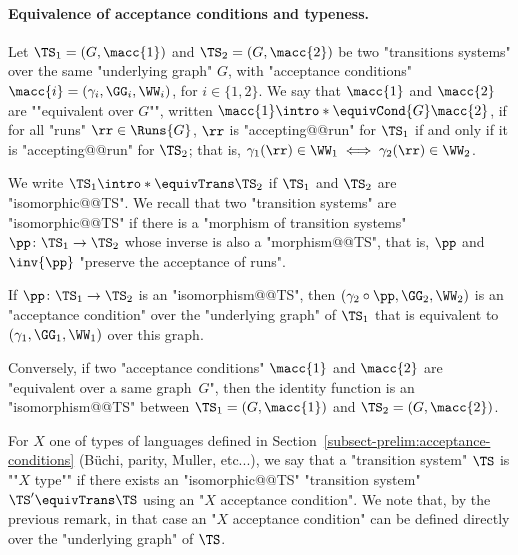 \documentclass[10pt,a4paper]{amsart}
\renewcommand{\gg}{\gamma}
\begin{document}
\paragraph*{Equivalence of acceptance conditions and typeness.}
 Let $\TS_1=(G, \macc{1})$ and $\TS_2=(G, \macc{2})$ be two "transitions systems" over the same "underlying graph" $G$, with "acceptance conditions" $\macc{i} = (\gg_i, \GG_i, \WW_i)$, for $i \in \{1,2\}$.
\AP We say that $\macc{1}$ and $\macc{2}$ are ""equivalent over $G$"", written $\macc{1} \intro*\equivCond{G} \macc{2}$, if for all "runs" $\rr\in \Runs{G}$, $\rr$ is "accepting@@run" for $\TS_1$ if and only if it is "accepting@@run" for $\TS_2$; that is, $\gg_{1}(\rr)\in \WW_1 \iff \gg_{2}(\rr)\in \WW_2$.

\AP We write $\TS_1 \intro*\equivTrans \TS_2$ if $\TS_1$ and $\TS_2$ are "isomorphic@@TS". We recall that two "transition systems" are "isomorphic@@TS" if there is a "morphism of transition systems" $\pp\colon \TS_1\to \TS_2$ whose inverse is also a "morphism@@TS", that is, $\pp$ and $\inv{\pp}$ "preserve the acceptance of runs".


\begin{remark}\label{rmk-typ:condition-transferred-by-isomorphism}
	If $\pp\colon \TS_1 \to \TS_2$ is an "isomorphism@@TS", then $(\gg_2\circ \pp, \GG_2, \WW_2)$ is an "acceptance condition" over the "underlying graph" of $\TS_1$ that is equivalent to $(\gg_1, \GG_1, \WW_1)$ over this graph.
	
	Conversely, if two "acceptance conditions" $\macc{1}$ and $\macc{2}$ are "equivalent over a same graph~$G$", then the identity function is an "isomorphism@@TS" between $\TS_1=(G, \macc{1})$ and $\TS_2=(G, \macc{2})$.
\end{remark}



\AP For $X$ one of types of languages defined in Section~\ref{subsect-prelim:acceptance-conditions} (B\"uchi, parity, Muller, etc...), we say that a "transition system" $\TS$ is ""$X$ type"" if there exists an "isomorphic@@TS" "transition system" $\TS'\equivTrans \TS$ using an "$X$ acceptance condition". We note that, by the previous remark, in that case an "$X$ acceptance condition" can be defined directly over the "underlying graph" of $\TS$.
\end{document}

